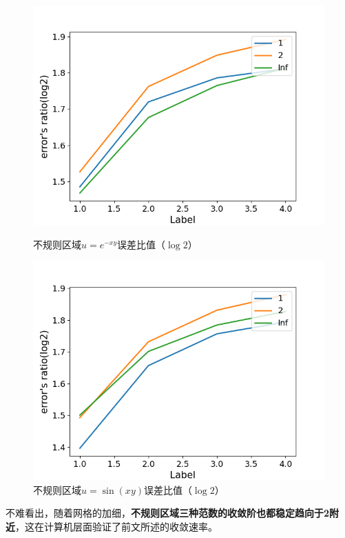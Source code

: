 \documentclass{ctexart}
\begin{document}
\begin{sloppypar}
\begin{figure}[H]
  \begin{minipage}[t]{0.5\linewidth}
    \centering
    \includegraphics[scale = 0.5]{f2_INE.png}
    \caption{不规则区域$u=e^{-xy}$误差比值（$\log 2$）}
  \end{minipage}
  \begin{minipage}[t]{0.5\linewidth}
    \centering
    \includegraphics[scale = 0.5]{f3_INE.png}
    \caption{不规则区域$u=\sin(xy)$误差比值（$\log 2$）}
  \end{minipage}
  \label{fig2}
\end{figure}
不难看出，随着网格的加细，\textbf{不规则区域三种范数的收敛阶也都稳定趋向于2附近}，这在计算机层面验证了前文所述的收敛速率。
\end{sloppypar}
\end{document}
